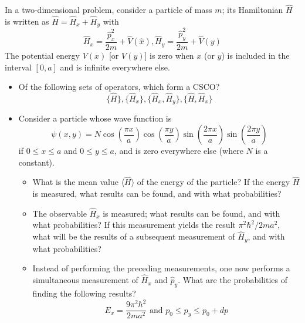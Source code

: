 \documentclass[12pt,a4paper]{article}
\newenvironment{problem}[2][Problem]{\begin{trivlist}
\item[\hskip \labelsep {\bfseries #1}\hskip \labelsep {\bfseries #2.}]}{\end{trivlist}}
\begin{document}
\begin{problem}{3}
[C-T Exercise 3-13] In a two-dimensional problem, consider a particle of mass $m$; its Hamiltonian $\hat{H}$ is written as $\hat{H}=\hat{H}_x+\hat{H}_y$ with
\[
\hat{H}_x=\frac{\hat{p}_x^2}{2m}+\hat{V}(\hat{x}),\hat{H}_y=\frac{\hat{p}_y^2}{2m}+\hat{V}(y)
\]
The potential energy $V(x)$ [or $V(y)$] is zero when $x$ (or $y$) is included in the interval $[0,a]$ and is infinite everywhere else.
\begin{itemize}
\item[(a)] Of the following sets of operators, which form a CSCO?
\[
\{\hat{H}\},\{\hat{H}_x\},\{\hat{H}_x,\hat{H}_y\},\{\hat{H},\hat{H}_x\}
\]
\item[(b)] Consider a particle whose wave function is
\[
\psi(x,y)=N\cos\left(\frac{\pi x}{a}\right)\cos\left(\frac{\pi y}{a}\right)\sin\left(\frac{2\pi x}{a}\right)\sin\left(\frac{2\pi y}{a}\right)
\]
if $0\leq x\leq a$ and $0\leq y\leq a$, and is zero everywhere else (where $N$ is a constant).
\begin{itemize}
\item[i.] What is the mean value $\langle\hat{H}\rangle$ of the energy of the particle? If the energy $\hat{H}$ is measured, what results can be found, and with what probabilities?
\item[ii.] The observable $\hat{H}_x$ is measured; what results can be found, and with what probabilities? If this measurement yields the result $\pi^2\hbar^2/2ma^2$, what will be the results of a subsequent measurement of $\hat{H}_y$, and with what probabilities?
\item[iii.] Instead of performing the preceding measurements, one now performs a simultaneous measurement of $\hat{H}_x$ and $\hat{p}_y$. What are the probabilities of finding the following results?
\[
E_x=\frac{9\pi^2\hbar^2}{2ma^2}\text{ and }p_0\leq p_y\leq p_0+dp
\]
\end{itemize}
\end{itemize}
\end{problem}
\end{document}
